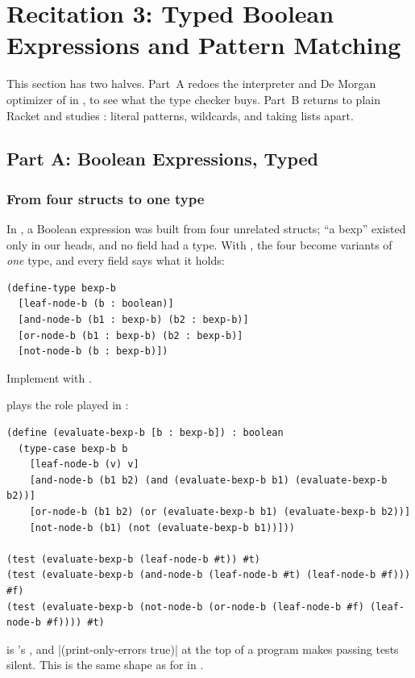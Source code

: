 \section{Recitation 3: Typed Boolean Expressions and Pattern Matching}
\label{sec:rec3}

This section has two halves. Part~A redoes the interpreter and De Morgan optimizer of  in , to see what the type checker buys. Part~B returns to plain Racket and studies : literal patterns, wildcards, and taking lists apart.

\subsection{Part A: Boolean Expressions, Typed}

\subsubsection{From four structs to one type} In , a Boolean expression was built from four unrelated structs; ``a bexp'' existed only in our heads, and no field had a type. With , the four become variants of \emph{one} type, and every field says what it holds:
\begin{lstlisting}
(define-type bexp-b
  [leaf-node-b (b : boolean)]
  [and-node-b (b1 : bexp-b) (b2 : bexp-b)]
  [or-node-b (b1 : bexp-b) (b2 : bexp-b)]
  [not-node-b (b : bexp-b)])
\end{lstlisting}

\begin{exercise}
Implement  with .
\end{exercise}
\begin{solution}
 plays the role  played in :
\begin{lstlisting}
(define (evaluate-bexp-b [b : bexp-b]) : boolean
  (type-case bexp-b b
    [leaf-node-b (v) v]
    [and-node-b (b1 b2) (and (evaluate-bexp-b b1) (evaluate-bexp-b b2))]
    [or-node-b (b1 b2) (or (evaluate-bexp-b b1) (evaluate-bexp-b b2))]
    [not-node-b (b1) (not (evaluate-bexp-b b1))]))

(test (evaluate-bexp-b (leaf-node-b #t)) #t)
(test (evaluate-bexp-b (and-node-b (leaf-node-b #t) (leaf-node-b #f))) #f)
(test (evaluate-bexp-b (not-node-b (or-node-b (leaf-node-b #f) (leaf-node-b #f)))) #t)
\end{lstlisting}
 is 's , and \rkt|(print-only-errors true)| at the top of a program makes passing tests silent. This is the same shape as  for  in .
\end{solution}

